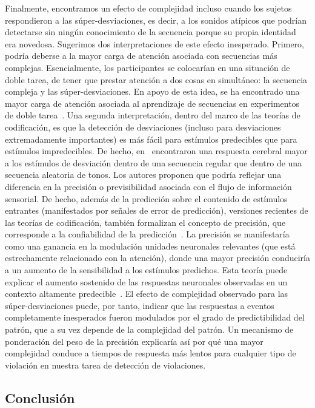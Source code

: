 Finalmente, encontramos un efecto de complejidad incluso cuando los sujetos respondieron a las súper-desviaciones, es decir, a los sonidos atípicos que podrían detectarse sin ningún conocimiento de la secuencia porque su propia identidad era novedosa. Sugerimos dos interpretaciones de este efecto inesperado. Primero, podría deberse a la mayor carga de atención asociada con secuencias más complejas. Esencialmente, los participantes se colocarían en una situación de doble tarea, de tener que prestar atención a dos cosas en simultáneo: la secuencia compleja y las súper-desviaciones. En apoyo de esta idea, se ha encontrado una mayor carga de atención asociada al aprendizaje de secuencias en experimentos de doble tarea~\cite{f125}. Una segunda interpretación, dentro del marco de las teorías de codificación, es que la detección de desviaciones (incluso para desviaciones extremadamente importantes) es más fácil para estímulos predecibles que para estímulos impredecibles. De hecho, en~\cite{f128} encontraron una respuesta cerebral mayor a los estímulos de desviación dentro de una secuencia regular que dentro de una secuencia aleatoria de tonos. Los autores proponen que podría reflejar una diferencia en la precisión o previsibilidad asociada con el flujo de información sensorial. De hecho, además de la predicción sobre el contenido de estímulos entrantes (manifestados por señales de error de predicción), versiones recientes de las teorías de codificación, también formalizan el concepto de precisión, que corresponde a la confiabilidad de la predicción~\cite{f80,f129,f130,f131,f132}. La precisión se manifestaría como una ganancia en la modulación unidades neuronales relevantes (que está estrechamente relacionado con la atención), donde una mayor precisión conduciría a un aumento de la sensibilidad a los estímulos predichos. Esta teoría puede explicar el aumento sostenido de las respuestas neuronales observadas en un contexto altamente predecible~\cite{f126,f128,f129,f133}. El efecto de complejidad observado para las súper-desviaciones puede, por tanto, indicar que las respuestas a eventos completamente inesperados fueron modulados por el grado de predictibilidad del patrón, que a su vez depende de la complejidad del patrón. Un mecanismo de ponderación del peso de la precisión explicaría así por qué una mayor complejidad conduce a tiempos de respuesta más lentos para cualquier tipo de violación en nuestra tarea de detección de violaciones.

\subsection{Conclusión}

